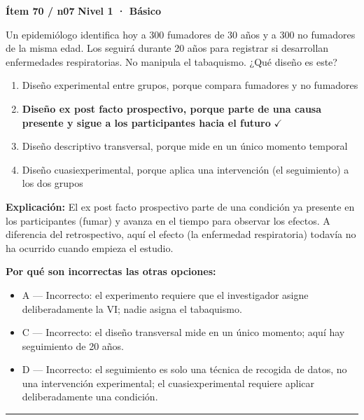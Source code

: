 \documentclass[12pt,a4paper]{article}
\begin{document}
\begin{mdframed}[backgroundcolor=fondogris,linecolor=azul,linewidth=1pt,innerleftmargin=10pt,innerrightmargin=10pt,innertopmargin=7pt,innerbottommargin=7pt]
\textbf{Ítem 70 / n07} \hfill {\small\bfseries\color{azul} Nivel 1 · Básico}
\end{mdframed}

Un epidemiólogo identifica hoy a 300 fumadores de 30 años y a 300 no fumadores de la misma edad. Los seguirá durante 20 años para registrar si desarrollan enfermedades respiratorias. No manipula el tabaquismo. ¿Qué diseño es este?

\begin{enumerate}
  \item[A.] Diseño experimental entre grupos, porque compara fumadores y no fumadores
  \item[\textbf{\color{verde}B.}] \textbf{\color{verde} Diseño ex post facto prospectivo, porque parte de una causa presente y sigue a los participantes hacia el futuro} \hfill $\checkmark$
  \item[C.] Diseño descriptivo transversal, porque mide en un único momento temporal
  \item[D.] Diseño cuasiexperimental, porque aplica una intervención (el seguimiento) a los dos grupos
\end{enumerate}

\noindent\textbf{\color{azul}Explicación:} El ex post facto prospectivo parte de una condición ya presente en los participantes (fumar) y avanza en el tiempo para observar los efectos. A diferencia del retrospectivo, aquí el efecto (la enfermedad respiratoria) todavía no ha ocurrido cuando empieza el estudio.

\noindent\textbf{\color{gris}Por qué son incorrectas las otras opciones:}
\begin{itemize}
  \item {\small A — Incorrecto: el experimento requiere que el investigador asigne deliberadamente la VI; nadie asigna el tabaquismo.}
  \item {\small C — Incorrecto: el diseño transversal mide en un único momento; aquí hay seguimiento de 20 años.}
  \item {\small D — Incorrecto: el seguimiento es solo una técnica de recogida de datos, no una intervención experimental; el cuasiexperimental requiere aplicar deliberadamente una condición.}
\end{itemize}
\vspace{8pt}\hrule\vspace{10pt}
\end{document}
